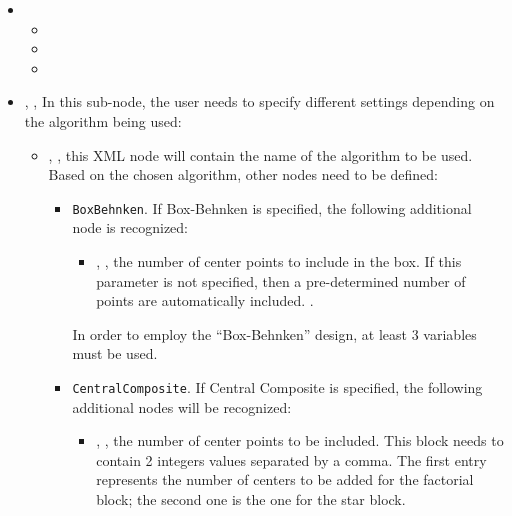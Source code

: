 \begin{itemize}
\item \variableDescription
 \variableChildrenIntro
 \begin{itemize}
    \item \distributionDescription
    \item \functionDescription
     \item \gridDescriptionOnlyCustom
 \end{itemize}
\item {}, ,
In this sub-node, the user needs to specify different settings depending on the
algorithm being used:
 \begin{itemize}
  \item {}, , this XML node
    will contain the name of the algorithm to be used.
    Based on the chosen algorithm, other nodes need to be defined:
    \begin{itemize}
      \item {}\texttt{BoxBehnken}. If Box-Behnken
        is specified, the following additional node is recognized:
     \begin{itemize}
      \item {}, , the
        number of center points to include in the box.
        If this parameter is not specified, then a pre-determined number of
        points are automatically included.
        .
     \end{itemize}
     \nb In order to employ the ``Box-Behnken'' design, at least 3 variables
     must be used.
     \item {}\texttt{CentralComposite}. If
       Central Composite is specified, the following additional nodes will
       be recognized:
     \begin{itemize}
      \item {}, , the number of center points to be included.
        This block needs to contain 2 integers values separated by a comma.
        The first entry represents the number of centers to be added for the
        factorial block; the second one is the one for the star block.

\end{itemize}
\end{itemize}
\end{itemize}
\end{itemize}
